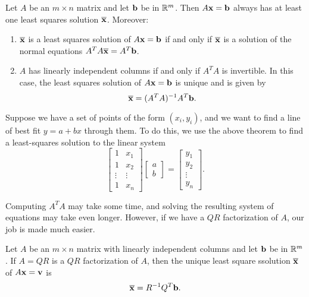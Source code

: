 \documentclass[../m73main.tex]{subfiles}
\begin{document}
\begin{theorem}
	Let $A$ be an $m \times n$ matrix and let $\mathbf{b}$ be in $\mathbb{R}^m$.
	Then $A \mathbf{x} = \mathbf{b}$ always has at least one least squares solution $\overline{\mathbf{x}}$.
	Moreover:
	\begin{enumerate}[label=(\alph*)]
		\item $\overline{\mathbf{x}}$ is a least squares solution of $A \mathbf{x} = \mathbf{b}$ if and only if $\overline{\mathbf{x}}$ is a solution of the normal equations $A^TA \overline{\mathbf{x}} = A^T \mathbf{b}$.
		\item $A$ has linearly independent columns if and only if $A^TA$ is invertible.
			  In this case, the least squares solution of $A \mathbf{x} = \mathbf{b}$ is unique and is given by
			  \[ \overline{\mathbf{x}} = (A^TA)^{-1}A^T \mathbf{b}. \]
	\end{enumerate}
\end{theorem}

Suppose we have a set of points of the form $(x_i, y_i)$, and we want to find a line of best fit $y = a + bx$ through them.
To do this, we use the above theorem to find a least-squares solution to the linear system
\[ \begin{bmatrix} 1 & x_1 \\ 1 & x_2 \\ \vdots & \vdots \\ 1 & x_n \end{bmatrix} \begin{bmatrix} a \\ b \end{bmatrix} = \begin{bmatrix} y_1 \\ y_2 \\ \vdots \\ y_n \end{bmatrix}. \]

Computing $A^T A$ may take some time, and solving the resulting system of equations may take even longer.
However, if we have a $QR$ factorization of $A$, our job is made much easier.

\begin{theorem}
	Let $A$ be an $m \times n$ matrix with linearly independent columns and let $\mathbf{b}$ be in $\mathbb{R}^m$.
	If $A = QR$ is a $QR$ factorization of $A$, then the unique least square ssolution $\overline{\mathbf{x}}$ of $A \mathbf{x} = \mathbf{v}$ is
	\[ \overline{\mathbf{x}} = R^{-1} Q^T \mathbf{b}. \]
\end{theorem}
\end{document}
